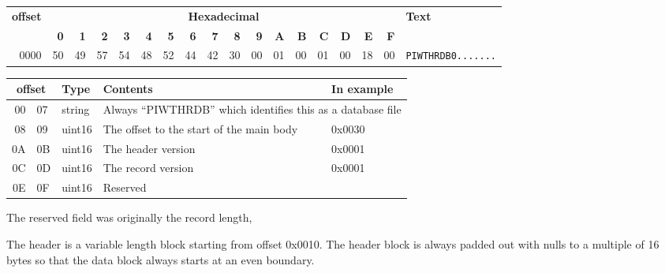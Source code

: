 \begin{table}[h*)]
    \begin{tabular}{r|rrrrrrrrrrrrrrrr|l}
        \hline
        \multirow{2}{*}{\textbf{offset}}& \multicolumn{16}{c|}{\textbf{Hexadecimal}} & \multirow{2}{*}{\textbf{Text}} \\
        &  \textbf{0}&\textbf{1}&\textbf{2}&\textbf{3}&
        \textbf{4}&\textbf{5}&\textbf{6}&\textbf{7}&
        \textbf{8}&\textbf{9}&\textbf{A}&\textbf{B}&
        \textbf{C}&\textbf{D}&\textbf{E}&\textbf{F}& \\
        \hline
        0000 &
        \cellcolor{yellow}50 & \cellcolor{yellow}49 & \cellcolor{yellow}57 & \cellcolor{yellow}54 &
        \cellcolor{yellow}48 & \cellcolor{yellow}52 & \cellcolor{yellow}44 & \multicolumn{1}{r|}{\cellcolor{yellow}42} &
        \cellcolor{blue!25}30 & \multicolumn{1}{r|}{\cellcolor{blue!25}00} &
        \cellcolor{red!25}01 & \multicolumn{1}{r|}{\cellcolor{red!25}00} &
        \cellcolor{green!25}01 & \multicolumn{1}{r|}{\cellcolor{green!25}00} &
        \cellcolor{grey!10}18 & \cellcolor{grey!10}00 &
        \texttt{PIWTHRDB0.......}\\
        \hline
    \end{tabular}
\end{table}

\begin{table}[h!)]
\begin{tabular}{r l l l l}
\multicolumn{2}{c}{\textbf{offset}} & \textbf{Type} & \textbf{Contents} & \textbf{In example}\\
\hline
00 & 07 & string & \multicolumn{2}{l}{Always ``PIWTHRDB'' which identifies this as a database file} \\
08 & 09 & uint16 & The offset to the start of the main body & 0x0030 \\
0A & 0B & uint16 & The header version & 0x0001 \\
0C & 0D & uint16 & The record version & 0x0001\\
0E & 0F & uint16 & Reserved & \\
\hline
\end{tabular}
\end{table}

The reserved field was originally the record length,
\label{subsec:database:header}

The header is a variable length block starting from offset 0x0010.
The header block is always padded out with nulls to a multiple of 16
bytes so that the data block always starts at an even boundary.

